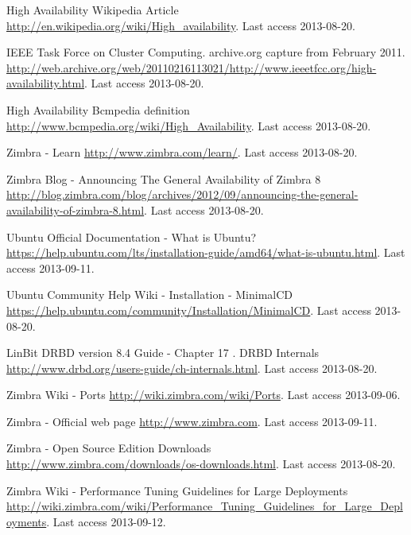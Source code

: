 
\begin{thebibliography}{1}


 High Availability Wikipedia Article
\url{http://en.wikipedia.org/wiki/High_availability}. Last access 2013-08-20.

 IEEE Task Force on Cluster Computing. archive.org capture from February 2011.
\url{http://web.archive.org/web/20110216113021/http://www.ieeetfcc.org/high-availability.html}. Last access 2013-08-20.

 High Availability Bcmpedia definition
\url{http://www.bcmpedia.org/wiki/High_Availability}. Last access 2013-08-20.

 Zimbra - Learn
\url{http://www.zimbra.com/learn/}. Last access 2013-08-20.

 Zimbra Blog - Announcing The General Availability of Zimbra 8
\url{http://blog.zimbra.com/blog/archives/2012/09/announcing-the-general-availability-of-zimbra-8.html}. Last access 2013-08-20.


 Ubuntu Official Documentation - What is Ubuntu?
\url{https://help.ubuntu.com/lts/installation-guide/amd64/what-is-ubuntu.html}. Last access 2013-09-11.

 Ubuntu Community Help Wiki - Installation - MinimalCD
\url{https://help.ubuntu.com/community/Installation/MinimalCD}. Last access 2013-08-20.

 LinBit DRBD version 8.4 Guide - Chapter 17 . DRBD Internals
\url{http://www.drbd.org/users-guide/ch-internals.html}. Last access 2013-08-20.


 Zimbra Wiki - Ports
\url{http://wiki.zimbra.com/wiki/Ports}. Last access 2013-09-06.


 Zimbra - Official web page
\url{http://www.zimbra.com}. Last access 2013-09-11.

 Zimbra - Open Source Edition Downloads
\url{http://www.zimbra.com/downloads/os-downloads.html}. Last access 2013-08-20.

 Zimbra Wiki - Performance Tuning Guidelines for Large Deployments
\url{http://wiki.zimbra.com/wiki/Performance_Tuning_Guidelines_for_Large_Deployments}. Last access 2013-09-12.


\end{thebibliography}
